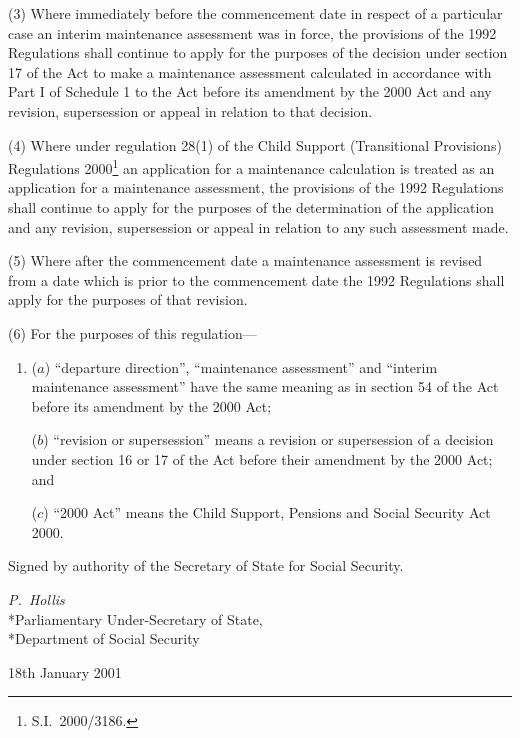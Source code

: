 \documentclass[12pt,a4paper]{article}
\begin{document}
(3) Where immediately before the commencement date in respect of a particular case an interim maintenance assessment was in force, the provisions of the 1992 Regulations shall continue to apply for the purposes of the decision under section 17 of the Act to make a maintenance assessment calculated in accordance with Part I of Schedule 1 to the Act before its amendment by the 2000 Act and any revision, supersession or appeal in relation to that decision.

(4) Where under regulation 28(1) of the Child Support (Transitional Provisions) Regulations 2000\footnote{S.I.\ 2000/3186.} an application for a maintenance calculation is treated as an application for a maintenance assessment, the provisions of the 1992 Regulations shall continue to apply for the purposes of the determination of the application and any revision, supersession or appeal in relation to any such assessment made.

(5) Where after the commencement date a maintenance assessment is revised from a date which is prior to the commencement date the 1992 Regulations shall apply for the purposes of that revision.

(6) For the purposes of this regulation—
\begin{enumerate}\item[]
($a$) “departure direction”, “maintenance assessment” and “interim maintenance assessment” have the same meaning as in section 54 of the Act before its amendment by the 2000 Act;

($b$) “revision or supersession” means a revision or supersession of a decision under section 16 or 17 of the Act before their amendment by the 2000 Act; and

($c$) “2000 Act” means the Child Support, Pensions and Social Security Act 2000.
\end{enumerate}


\bigskip

Signed 
by authority of the Secretary of State for Social Security.

{\raggedleft
\emph{P.~Hollis}\\*Parliamentary Under-Secretary of State,\\*Department of Social Security

}

18th January 2001
\end{document}
